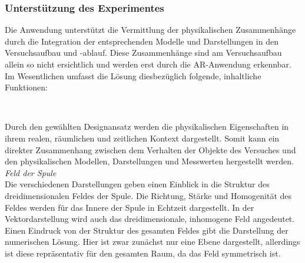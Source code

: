 \subsubsection{Unterstützung des Experimentes}
Die Anwendung unterstützt die Vermittlung der physikalischen Zusammenhänge durch die Integration der entsprechenden Modelle und Darstellungen in den Versuchsaufbau und -ablauf. Diese Zusammenhänge sind am Versuchsaufbau allein so nicht ersichtlich und werden erst durch die AR-Anwendung erkennbar. Im Wesentlichen umfasst die Lösung diesbezüglich folgende, inhaltliche Funktionen:
\vspace{8px}
\begin{center}
	\\
\end{center}
\vspace{6px}

Durch den gewählten Designansatz werden die physikalischen Eigenschaften in ihrem realen, räumlichen und zeitlichen Kontext dargestellt. Somit kann ein direkter Zusammenhang zwischen dem Verhalten der Objekte des Versuches und den physikalischen Modellen, Darstellungen und Messwerten hergestellt werden.\\

\textit{Feld der Spule}\\
Die verschiedenen Darstellungen geben einen Einblick in die Struktur des dreidimensionalen Feldes der Spule. Die Richtung, Stärke und Homogenität des Feldes werden für das Innere der Spule in Echtzeit dargestellt. In der Vektordarstellung wird auch das dreidimensionale, inhomogene Feld angedeutet. Einen Eindruck von der Struktur des gesamten Feldes gibt die Darstellung der numerischen Lösung. Hier ist zwar zunächst nur eine Ebene dargestellt, allerdings ist diese repräsentativ für den gesamten Raum, da das Feld symmetrisch ist.\\

